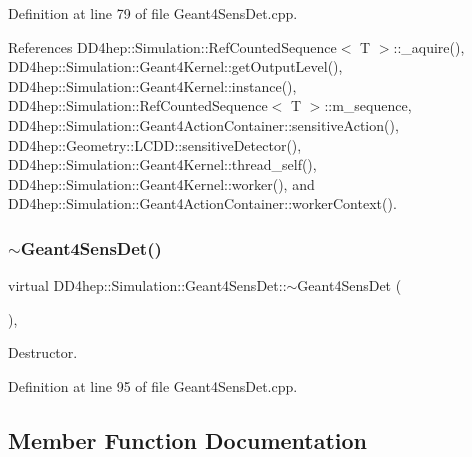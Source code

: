Definition at line 79 of file Geant4\+Sens\+Det.\+cpp.



References D\+D4hep\+::\+Simulation\+::\+Ref\+Counted\+Sequence$<$ T $>$\+::\+\_\+aquire(), D\+D4hep\+::\+Simulation\+::\+Geant4\+Kernel\+::get\+Output\+Level(), D\+D4hep\+::\+Simulation\+::\+Geant4\+Kernel\+::instance(), D\+D4hep\+::\+Simulation\+::\+Ref\+Counted\+Sequence$<$ T $>$\+::m\+\_\+sequence, D\+D4hep\+::\+Simulation\+::\+Geant4\+Action\+Container\+::sensitive\+Action(), D\+D4hep\+::\+Geometry\+::\+L\+C\+D\+D\+::sensitive\+Detector(), D\+D4hep\+::\+Simulation\+::\+Geant4\+Kernel\+::thread\+\_\+self(), D\+D4hep\+::\+Simulation\+::\+Geant4\+Kernel\+::worker(), and D\+D4hep\+::\+Simulation\+::\+Geant4\+Action\+Container\+::worker\+Context().

\hypertarget{class_d_d4hep_1_1_simulation_1_1_geant4_sens_det_a29286fa61cf355cd3572e73bf5e77204}{}\label{class_d_d4hep_1_1_simulation_1_1_geant4_sens_det_a29286fa61cf355cd3572e73bf5e77204} 
\subsubsection{\texorpdfstring{$\sim$\+Geant4\+Sens\+Det()}{~Geant4SensDet()}}
{\footnotesize\ttfamily virtual D\+D4hep\+::\+Simulation\+::\+Geant4\+Sens\+Det\+::$\sim$\+Geant4\+Sens\+Det (\begin{DoxyParamCaption}{ }\end{DoxyParamCaption})\hspace{0.3cm}{\ttfamily [inline]}, {\ttfamily [virtual]}}



Destructor. 



Definition at line 95 of file Geant4\+Sens\+Det.\+cpp.



\subsection{Member Function Documentation}
\hypertarget{class_d_d4hep_1_1_simulation_1_1_geant4_sens_det_a2283761cd59731dac3f113b3bf26bf9d}{}\label{class_d_d4hep_1_1_simulation_1_1_geant4_sens_det_a2283761cd59731dac3f113b3bf26bf9d} 
